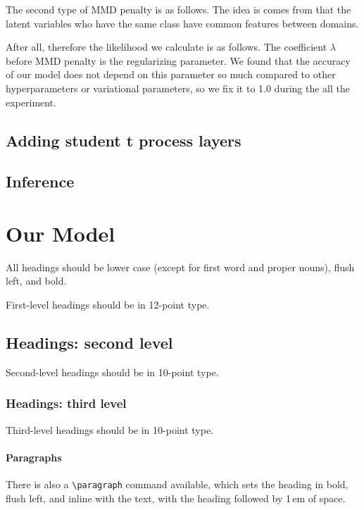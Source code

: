 \documentclass{article}
\begin{document}
The second type of MMD penalty is as follows. The idea is comes from that the latent variables who have the same class have common features between domains.

After all, therefore the likelihood we calculate is as follows. The coefficient $\lambda$ before MMD penalty is the regularizing parameter. We found that the accuracy of our model does not depend on this parameter so much compared to other hyperparameters or  variational parameters, so we fix it to 1.0 during the all the experiment.

\subsection{Adding student t process layers}



\subsection{Inference}

\section{Our Model}
\label{headings}

All headings should be lower case (except for first word and proper
nouns), flush left, and bold.

First-level headings should be in 12-point type.

\subsection{Headings: second level}

Second-level headings should be in 10-point type.

\subsubsection{Headings: third level}

Third-level headings should be in 10-point type.

\paragraph{Paragraphs}

There is also a \verb+\paragraph+ command available, which sets the
heading in bold, flush left, and inline with the text, with the
heading followed by 1\,em of space.
\end{document}
